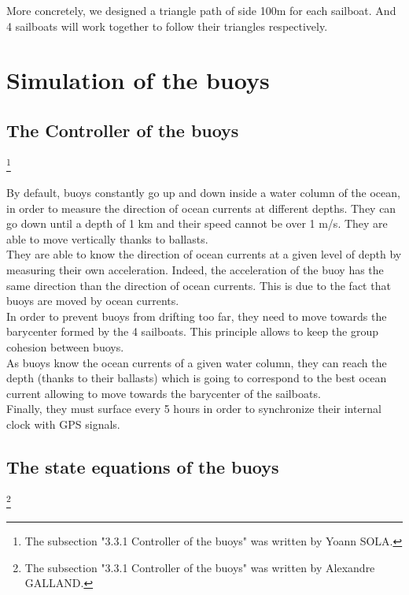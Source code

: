\documentclass[a4paper]{report}
\begin{document}
More concretely, we designed a triangle path of side 100m for each sailboat. And 4 sailboats will work together to follow their triangles respectively.


\section{Simulation of the buoys}
\subsection{The Controller of the buoys}

\footnote{The subsection "3.3.1 Controller of the buoys" was written by Yoann SOLA.}

By default, buoys constantly go up and down inside a water column of the ocean, in order to measure the direction of ocean currents at different depths. They can go down until a depth of 1 km and their speed cannot be over 1 m/s. They are able to move vertically thanks to ballasts.\\

They are able to know the direction of ocean currents at a given level of depth by measuring their own acceleration. Indeed, the acceleration of the buoy has the same direction than the direction of ocean currents. This is due to the fact that buoys are moved by ocean currents.\\

In order to prevent buoys from drifting too far, they need to move towards the barycenter formed by the 4 sailboats. This principle allows to keep the group cohesion between buoys.\\

As buoys know the ocean currents of a given water column, they can reach the depth (thanks to their ballasts) which is going to correspond to the best ocean current allowing to move towards the barycenter of the sailboats.\\

Finally, they must surface every 5 hours in order to synchronize their internal clock with GPS signals.





\subsection{The state equations of the buoys}

\footnote{The subsection "3.3.1 Controller of the buoys" was written by Alexandre GALLAND.}
\end{document}
